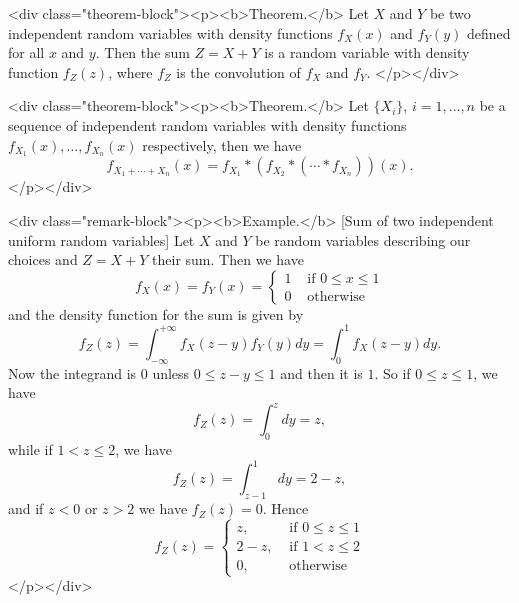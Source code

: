 <div class="theorem-block"><p><b>Theorem.</b> 
Let $X$ and $Y$ be two independent random variables with density functions $f_X(x)$ and $f_Y(y)$ defined for all $x$ and $y$. Then the sum $Z = X + Y$ is a random variable with density function $f_Z(z)$, where $f_Z$ is the convolution of $f_X$ and $f_Y$.
</p></div>

<div class="theorem-block"><p><b>Theorem.</b> 
Let $\{X_i\}$, $i=1,\dots, n$ be a sequence of independent random variables with density functions $f_{X_1}(x), \dots, f_{X_n}(x)$ respectively, then we have 
$$\begin{equation}
    f_{X_1 + \cdots + X_n}(x) = f_{X_1} * \left( f_{X_2} * ( \cdots * f_{X_n}) \right)(x).
\end{equation}$$
</p></div>

<div class="remark-block"><p><b>Example.</b> [Sum of two independent uniform random variables]
Let $X$ and $Y$ be random variables describing our choices and $Z = X + Y$ their sum. Then we have
$$\begin{equation}
    f_{X}(x)=f_{Y}(x)=\left\{\begin{array}{ll}{1} & {\text { if } 0 \leq x \leq 1} \\ {0} & {\text { otherwise }}\end{array}\right.
\end{equation}$$
and the density function for the sum is given by
$$\begin{equation}
    f_{Z}(z)=\int_{-\infty}^{+\infty} f_{X}(z-y) f_{Y}(y) d y = \int_{0}^{1} f_{X}(z-y) d y.
\end{equation}$$
Now the integrand is $0$ unless $0 \leq z-y \leq 1$ and then it is $1$. So if $0 \leq z \leq 1$, we have 
$$\begin{equation}
    f_{Z}(z)=\int_{0}^{z} d y=z,
\end{equation}$$
while if $1 < z \leq 2$, we have
$$\begin{equation}
    f_{Z}(z)=\int_{z-1}^{1} d y=2-z, 
\end{equation}$$
and if $z < 0$ or $z > 2$ we have $f_Z(z) = 0$. Hence
$$\begin{equation}
    f_{Z}(z)=\left\{\begin{array}{ll}{z,} & {\text { if } 0 \leq z \leq 1} \\ {2-z,} & {\text { if } 1<z \leq 2} \\ {0,} & {\text { otherwise }}\end{array}\right.
\end{equation}$$
</p></div>

